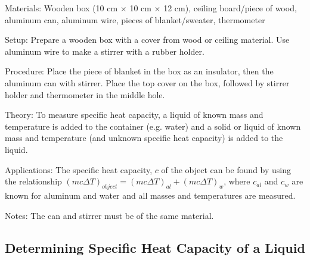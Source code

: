 \begin{multicols}{2}
\begin{description*}
\item[Materials:]{Wooden box (10 cm $\times$ 10 cm $\times$ 12 cm), ceiling board/piece of wood, aluminum can, aluminum wire, pieces of blanket/sweater, thermometer}
\item[Setup:]{Prepare a wooden box with a cover from wood or ceiling material. Use aluminum wire to make a stirrer with a rubber holder.}
\item[Procedure:]{Place the piece of blanket in the box as an insulator, then the aluminum can with stirrer. Place the top cover on the box, followed by stirrer holder and thermometer in the middle hole.}
\item[Theory:]{To measure specific heat capacity, a liquid of known mass and temperature is added to the container (e.g. water) and a solid or liquid of known mass and temperature (and unknown specific heat capacity) is added to the liquid.}
\item[Applications:]{The specific heat capacity, $c$ of the object can be found by using the relationship $(mc\Delta T)_{object} = (mc\Delta T)_{al} + (mc\Delta T)_{w}$, where $c_{al}$ and $c_{w}$ are known for aluminum and water and all masses and temperatures are measured.}
\item[Notes:]{The can and stirrer must be of the same material.}
\end{description*}

\subsection{Determining Specific Heat Capacity of a Liquid}



\end{multicols}
